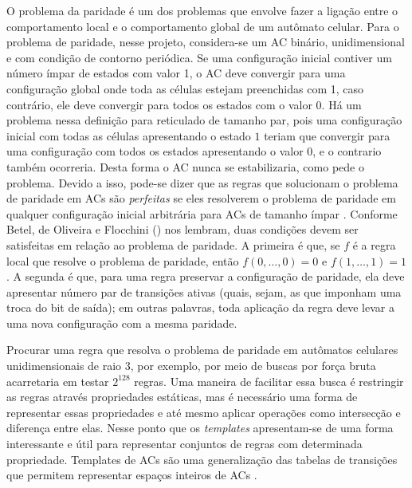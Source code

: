 O problema da paridade é um dos problemas que envolve fazer a ligação entre o comportamento local e o comportamento global de um autômato celular. Para o problema de paridade, nesse projeto, considera-se um AC binário, unidimensional e com condição de contorno periódica. Se uma configuração inicial contiver um número ímpar de estados com valor 1, o AC deve convergir para uma configuração global onde toda as células estejam preenchidas com 1, caso contrário, ele deve convergir para todos os estados com o valor 0. Há um problema nessa definição para  reticulado de tamanho par, pois uma configuração inicial com todas as células apresentando o estado $1$ teriam que convergir para uma configuração com todos os estados apresentando o valor $0$, e o contrario também ocorreria. Desta forma o AC nunca se estabilizaria, como pede o problema. Devido a isso, pode-se dizer que as regras que solucionam o problema de paridade em ACs são \textit{perfeitas} se eles resolverem o problema de paridade em qualquer configuração inicial arbitrária para ACs de tamanho ímpar \cite{Betel2013}. Conforme Betel, de Oliveira e Flocchini (\citeyear{Betel2013}) nos lembram, duas condições devem ser satisfeitas em relação ao problema de paridade. A primeira é que, se $f$ é a regra local que resolve o problema de paridade, então $f(0, \dots, 0) = 0$ e $f(1, \dots, 1) = 1$. A segunda é que, para uma regra preservar a configuração de paridade, ela deve apresentar número par de transições ativas (quais, sejam, as que imponham uma troca do bit de saída); em outras palavras, toda aplicação da regra deve levar a uma nova configuração com a mesma paridade.

Procurar uma regra que resolva o problema de paridade em autômatos celulares unidimensionais de raio 3, por exemplo, por meio de buscas por força bruta acarretaria em testar $2^{128}$ regras. Uma maneira de facilitar essa busca é restringir as regras através propriedades estáticas, mas é necessário uma forma de representar essas propriedades e até mesmo aplicar operações como intersecção e diferença entre elas. Nesse ponto que os \textit{templates} apresentam-se de uma forma interessante e útil para representar conjuntos de regras com determinada propriedade. Templates de ACs são uma generalização das tabelas de transições que permitem representar espaços inteiros de ACs \cite{Verardo2014}.%